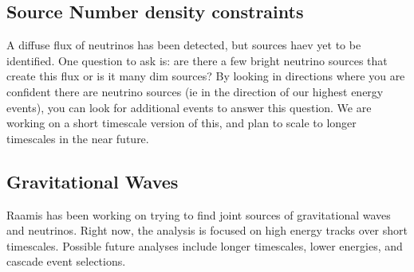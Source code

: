 \subsection*{\textbf{Source Number density constraints}}
A diffuse flux of neutrinos has been detected, but sources haev yet to be identified. One question to ask is: are there a few bright neutrino sources that create this flux or is it many dim sources? By looking in directions where you are confident there are neutrino sources (ie in the direction of our highest energy events), you can look for additional events to answer this question. We are working on a short timescale version of this, and plan to scale to longer timescales in the near future.

\subsection*{\textbf{Gravitational Waves}}
Raamis has been working on trying to find joint sources of gravitational waves and neutrinos. Right now, the analysis is focused on high energy tracks over short timescales. Possible future analyses include longer timescales, lower energies, and cascade event selections. 